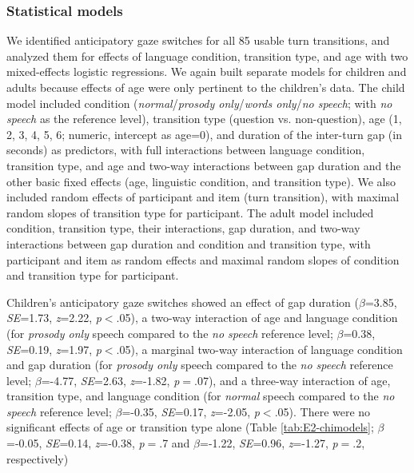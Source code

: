 \documentclass[authoryear, 12pt]{elsarticle}
\begin{document}
\subsubsection*{Statistical models}
\label{sec:models2}

We identified anticipatory gaze switches for all 85 usable turn transitions, and analyzed them for effects of language condition, transition type, and age with two mixed-effects logistic regressions. We again built separate models for children and adults because effects of age were only pertinent to the children's data. The child model included condition (\textit{normal}/\textit{prosody only}/\textit{words only}/\textit{no speech}; with \textit{no speech} as the reference level), transition type (question vs. non-question), age (1, 2, 3, 4, 5, 6; numeric, intercept as age=0), and duration of the inter-turn gap (in seconds) as predictors, with full interactions between language condition, transition type, and age and two-way interactions between gap duration and the other basic fixed effects (age, linguistic condition, and transition type).  We also included random effects of participant and item (turn transition), with maximal random slopes of transition type for participant. The adult model included condition, transition type, their interactions, gap duration, and two-way interactions between gap duration and condition and transition type, with participant and item as random effects and maximal random slopes of condition and transition type for participant.

Children's anticipatory gaze switches showed an effect of gap duration (\textit{$\beta$}=3.85, \textit{SE}=1.73, \textit{z}=2.22, \textit{p}$<$.05), a two-way interaction of age and language condition (for \textit{prosody only} speech compared to the \textit{no speech} reference level; \textit{$\beta$}=0.38, \textit{SE}=0.19, \textit{z}=1.97, \textit{p}$<$.05), a marginal two-way interaction of language condition and gap duration (for \textit{prosody only} speech compared to the \textit{no speech} reference level; \textit{$\beta$}=-4.77, \textit{SE}=2.63, \textit{z}=-1.82, \textit{p}$=$.07), and a three-way interaction of age, transition type, and language condition (for \textit{normal} speech compared to the \textit{no speech} reference level; \textit{$\beta$}=-0.35, \textit{SE}=0.17, \textit{z}=-2.05, \textit{p}$<$.05). There were no significant effects of age or transition type alone (Table \ref{tab:E2-chimodels}; \textit{$\beta$}=-0.05, \textit{SE}=0.14, \textit{z}=-0.38, \textit{p}$=$.7 and \textit{$\beta$}=-1.22, \textit{SE}=0.96, \textit{z}=-1.27, \textit{p}$=$.2, respectively)
\end{document}
